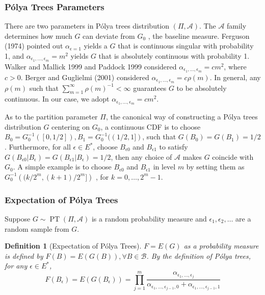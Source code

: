 \documentclass[12pt]{article}
\newtheorem{deff}[thm]{Definition}
\newcommand{\polya}{P\'{o}lya}
\DeclareMathOperator{\pt}{PT}
\begin{document}
\subsubsection{\polya{} Trees Parameters}
There are two parameters in \polya{} trees distribution $(\Pi,
\mathcal{A})$. The $\mathcal{A}$ family determines how much $G$ can
deviate from $G_0$ , the baseline measure. Ferguson (1974) pointed out
$\alpha_{\epsilon = 1} $ yields a $G$ that is continuous singular with
probability 1, and $\alpha_{\epsilon_1, \ldots, \epsilon_m} = m^2$
yields $G$ that is absolutely continuous with probability 1. Walker
and Mallick 1999 and Paddock 1999 considered $\alpha_{\epsilon_1,
  \ldots, \epsilon_m} = cm^2$, where $c > 0$. Berger and  Guglielmi
(2001) considered $\alpha_{\epsilon_1, \ldots, \epsilon_m} = c
\rho(m)$. In general, any $\rho(m) $ such that $\sum_{m=1}^{\infty}
\rho(m)^{-1} < \infty$ guarantees $G$ to be absolutely continuous. In
our case, we adopt $\alpha_{\epsilon_1, \ldots, \epsilon_m} = cm^2$.

As to the partition parameter $\Pi$, the canonical way of constructing
a \polya{} trees distribution $G$ centering on $G_0$, a continuous CDF
is to choose $B_0 = G^{-1}_0 ([0, 1/2]), B_1 = G^{-1}_0 ((1/2,1])$,
such that $G(B_0) = G(B_1)= 1/2$. Furthermore, for all $\epsilon \in
E^{*}$, choose $B_{\epsilon 0 }$ and $B_{\epsilon 1}$ to satisfy 
$G(B_{\epsilon 0 } |B_{\epsilon} ) = G(B_{\epsilon 1} | B_{\epsilon})
= 1/2 $, then any choice of $\mathcal{A} $ makes $G$ coincide with
$G_0$. A simple example is to choose $B_{\epsilon 0} $ and
$B_{\epsilon 1}$ in level $m$ by setting them as $G^{-1}_0 \left(
  (k/2^m, (k+1)/2^m] \right)$ , for $k=0, \ldots, 2^m-1$. 

\subsubsection{Expectation of \polya{} Trees}
Suppose $G \sim \pt (\Pi, \mathcal{A})$ is a random probability
measure and $\epsilon_1, \epsilon_2, \ldots$ are a random sample from $G$. 

\begin{deff}[Expectation of \polya{} Trees]
$F= E(G)$ as a probability measure is defined by $F(B) = E(G(B)),
\forall B \in \mathcal{B}$. By the definition of \polya{} trees, for any
$\epsilon \in E^{*}$, 
\begin{displaymath}
F(B_{\epsilon})  = E(G(B_{\epsilon})) = \prod_{j=1}^m
\frac{\alpha_{\epsilon_1, \ldots, \epsilon_j}}{\alpha_{\epsilon_1,
    \ldots, \epsilon_{j-1},0} + \alpha_{\epsilon_1, \ldots, \epsilon_{j-1},1}}
\end{displaymath}
\end{deff}
\end{document}
